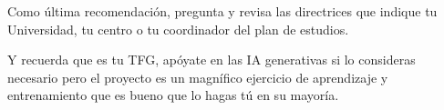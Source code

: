 

Como última recomendación, pregunta y revisa las directrices que indique tu Universidad, tu centro o tu coordinador del plan de estudios. 

Y recuerda que es tu TFG, apóyate en las IA generativas si lo consideras necesario pero el proyecto es un magnífico ejercicio de aprendizaje y entrenamiento que es bueno que lo hagas tú en su mayoría.







